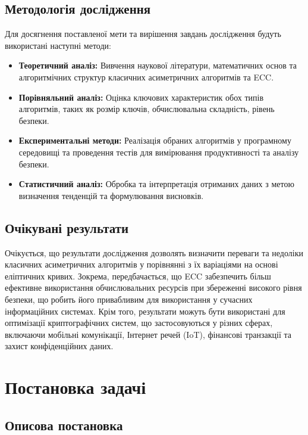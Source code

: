\documentclass[12pt]{report}
\theoremstyle{definition}
\theoremstyle{plain}
\begin{document}
\section{Методологія дослідження}

Для досягнення поставленої мети та вирішення завдань дослідження будуть використані наступні методи:

\begin{itemize}
    \item \textbf{Теоретичний аналіз:} Вивчення наукової літератури, математичних основ та алгоритмічних структур класичних асиметричних алгоритмів та ECC.
    \item \textbf{Порівняльний аналіз:} Оцінка ключових характеристик обох типів алгоритмів, таких як розмір ключів, обчислювальна складність, рівень безпеки.
    \item \textbf{Експериментальні методи:} Реалізація обраних алгоритмів у програмному середовищі та проведення тестів для вимірювання продуктивності та аналізу безпеки.
    \item \textbf{Статистичний аналіз:} Обробка та інтерпретація отриманих даних з метою визначення тенденцій та формулювання висновків.
\end{itemize}

\section{Очікувані результати}

Очікується, що результати дослідження дозволять визначити переваги та недоліки класичних асиметричних алгоритмів у порівнянні з їх варіаціями на основі еліптичних кривих. Зокрема, передбачається, що ECC забезпечить більш ефективне використання обчислювальних ресурсів при збереженні високого рівня безпеки, що робить його привабливим для використання у сучасних інформаційних системах. Крім того, результати можуть бути використані для оптимізації криптографічних систем, що застосовуються у різних сферах, включаючи мобільні комунікації, Інтернет речей (IoT), фінансові транзакції та захист конфіденційних даних.

\chapter{Постановка задачі}

\section{Описова постановка}
\end{document}
